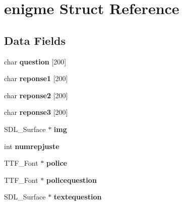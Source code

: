 \hypertarget{structenigme}{}\section{enigme Struct Reference}
\label{structenigme}
\subsection*{Data Fields}
\begin{DoxyCompactItemize}
\item 
char {\bfseries question} \mbox{[}200\mbox{]}\hypertarget{structenigme_a13c263b6a2a06090e3b87ca725152ffb}{}\label{structenigme_a13c263b6a2a06090e3b87ca725152ffb}

\item 
char {\bfseries reponse1} \mbox{[}200\mbox{]}\hypertarget{structenigme_a1d31bead9270c4be04f410820b285ade}{}\label{structenigme_a1d31bead9270c4be04f410820b285ade}

\item 
char {\bfseries reponse2} \mbox{[}200\mbox{]}\hypertarget{structenigme_a97f9390bd04fc83a0a7a84f3bf03464d}{}\label{structenigme_a97f9390bd04fc83a0a7a84f3bf03464d}

\item 
char {\bfseries reponse3} \mbox{[}200\mbox{]}\hypertarget{structenigme_ad7f3c27ab2d1e20502ee3a39040c99f3}{}\label{structenigme_ad7f3c27ab2d1e20502ee3a39040c99f3}

\item 
S\+D\+L\+\_\+\+Surface $\ast$ {\bfseries img}\hypertarget{structenigme_ac5c2141e5f8c366ff16d1fad83ee3e54}{}\label{structenigme_ac5c2141e5f8c366ff16d1fad83ee3e54}

\item 
int {\bfseries numrepjuste}\hypertarget{structenigme_a0d5d54cb6600ef161c4bcb717056432e}{}\label{structenigme_a0d5d54cb6600ef161c4bcb717056432e}

\item 
T\+T\+F\+\_\+\+Font $\ast$ {\bfseries police}\hypertarget{structenigme_a63ffe54c589cabf303d7240afec104e5}{}\label{structenigme_a63ffe54c589cabf303d7240afec104e5}

\item 
T\+T\+F\+\_\+\+Font $\ast$ {\bfseries policequestion}\hypertarget{structenigme_a777fe6d777b296ad91d09a8473f6b1ca}{}\label{structenigme_a777fe6d777b296ad91d09a8473f6b1ca}

\item 
S\+D\+L\+\_\+\+Surface $\ast$ {\bfseries textequestion}\hypertarget{structenigme_a2028fcc3934ef8042304fb68fcc848c5}{}\label{structenigme_a2028fcc3934ef8042304fb68fcc848c5}


\end{DoxyCompactItemize}
